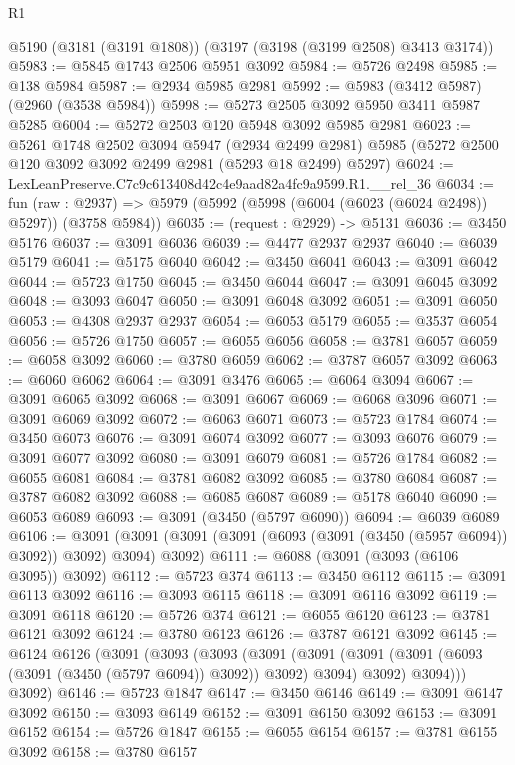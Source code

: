 \begin{lexlean}{R1}
\begin{coremodule}
    @5190
    (@3181 (@3191 @1808))
    (@3197 (@3198 (@3199 @2508) @3413 @3174))
@5983 := @5845 @1743 @2506 @5951 @3092
@5984 := @5726 @2498
@5985 := @138 @5984
@5987 := @2934 @5985 @2981
@5992 := @5983 (@3412 @5987) (@2960 (@3538 @5984))
@5998 := @5273 @2505 @3092 @5950 @3411 @5987 @5285
@6004 := @5272 @2503 @120 @5948 @3092 @5985 @2981
@6023 := @5261
    @1748
    @2502
    @3094
    @5947
    (@2934 @2499 @2981)
    @5985
    (@5272 @2500 @120 @3092 @3092 @2499 @2981 (@5293 @18 @2499) @5297)
@6024 := LexLeanPreserve.C7c9c613408d42c4e9aad82a4fc9a9599.R1.__rel_36
@6034 := fun (raw : @2937) =>
  @5979 (@5992 (@5998 (@6004 (@6023 (@6024 @2498)) @5297)) (@3758 @5984))
@6035 := (request : @2929) -> @5131
@6036 := @3450 @5176
@6037 := @3091 @6036
@6039 := @4477 @2937 @2937
@6040 := @6039 @5179
@6041 := @5175 @6040
@6042 := @3450 @6041
@6043 := @3091 @6042
@6044 := @5723 @1750
@6045 := @3450 @6044
@6047 := @3091 @6045 @3092
@6048 := @3093 @6047
@6050 := @3091 @6048 @3092
@6051 := @3091 @6050
@6053 := @4308 @2937 @2937
@6054 := @6053 @5179
@6055 := @3537 @6054
@6056 := @5726 @1750
@6057 := @6055 @6056
@6058 := @3781 @6057
@6059 := @6058 @3092
@6060 := @3780 @6059
@6062 := @3787 @6057 @3092
@6063 := @6060 @6062
@6064 := @3091 @3476
@6065 := @6064 @3094
@6067 := @3091 @6065 @3092
@6068 := @3091 @6067
@6069 := @6068 @3096
@6071 := @3091 @6069 @3092
@6072 := @6063 @6071
@6073 := @5723 @1784
@6074 := @3450 @6073
@6076 := @3091 @6074 @3092
@6077 := @3093 @6076
@6079 := @3091 @6077 @3092
@6080 := @3091 @6079
@6081 := @5726 @1784
@6082 := @6055 @6081
@6084 := @3781 @6082 @3092
@6085 := @3780 @6084
@6087 := @3787 @6082 @3092
@6088 := @6085 @6087
@6089 := @5178 @6040
@6090 := @6053 @6089
@6093 := @3091 (@3450 (@5797 @6090))
@6094 := @6039 @6089
@6106 := @3091 (@3091 (@3091 (@3091 (@6093 (@3091 (@3450 (@5957 @6094)) @3092)) @3092) @3094) @3092)
@6111 := @6088 (@3091 (@3093 (@6106 @3095)) @3092)
@6112 := @5723 @374
@6113 := @3450 @6112
@6115 := @3091 @6113 @3092
@6116 := @3093 @6115
@6118 := @3091 @6116 @3092
@6119 := @3091 @6118
@6120 := @5726 @374
@6121 := @6055 @6120
@6123 := @3781 @6121 @3092
@6124 := @3780 @6123
@6126 := @3787 @6121 @3092
@6145 := @6124
    @6126
    (@3091
      (@3093
        (@3093
          (@3091
            (@3091 (@3091 (@3091 (@6093 (@3091 (@3450 (@5797 @6094)) @3092)) @3092) @3094) @3092)
            @3094)))
      @3092)
@6146 := @5723 @1847
@6147 := @3450 @6146
@6149 := @3091 @6147 @3092
@6150 := @3093 @6149
@6152 := @3091 @6150 @3092
@6153 := @3091 @6152
@6154 := @5726 @1847
@6155 := @6055 @6154
@6157 := @3781 @6155 @3092
@6158 := @3780 @6157

\end{coremodule}
\end{lexlean}
